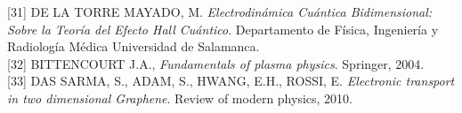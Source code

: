\documentclass[11pt,letterpaper]{article}     %
\begin{document}
[31] DE LA TORRE MAYADO, M. \emph{Electrodinámica Cuántica Bidimensional: Sobre
la Teoría del Efecto Hall Cuántico}. Departamento de Física, Ingeniería y Radiología Médica Universidad de Salamanca. \\

[32] BITTENCOURT J.A., \emph{Fundamentals of plasma physics}. Springer, 2004. \\

[33] DAS SARMA, S., ADAM, S., HWANG, E.H., ROSSI, E. \emph{Electronic transport in two dimensional Graphene}. Review of modern physics, 2010. \\



















%


\end{document}
